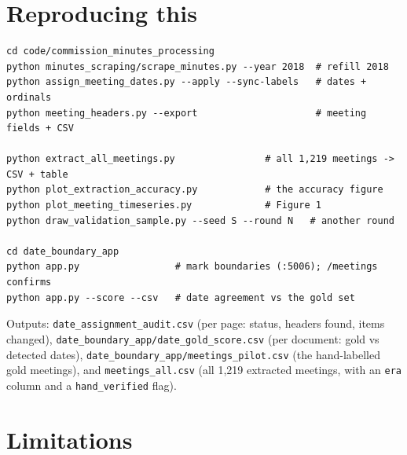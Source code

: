 \documentclass[11pt]{article}
\begin{document}
\section{Reproducing this}

\begin{verbatim}
cd code/commission_minutes_processing
python minutes_scraping/scrape_minutes.py --year 2018  # refill 2018
python assign_meeting_dates.py --apply --sync-labels   # dates + ordinals
python meeting_headers.py --export                     # meeting fields + CSV

python extract_all_meetings.py                # all 1,219 meetings -> CSV + table
python plot_extraction_accuracy.py            # the accuracy figure
python plot_meeting_timeseries.py             # Figure 1
python draw_validation_sample.py --seed S --round N   # another round

cd date_boundary_app
python app.py                 # mark boundaries (:5006); /meetings confirms
python app.py --score --csv   # date agreement vs the gold set
\end{verbatim}

\begin{sloppypar}
\noindent
Outputs: \texttt{date\_assignment\_audit.csv} (per page: status, headers found, items
changed), \texttt{date\_boundary\_app/date\_gold\_score.csv} (per document: gold vs detected
dates), \texttt{date\_boundary\_app/meetings\_pilot.csv} (the hand-labelled gold meetings), and
\texttt{meetings\_all.csv} (all 1{,}219 extracted meetings, with an \texttt{era} column and
a \texttt{hand\_verified} flag).
\end{sloppypar}

\section{Limitations}
\end{document}

